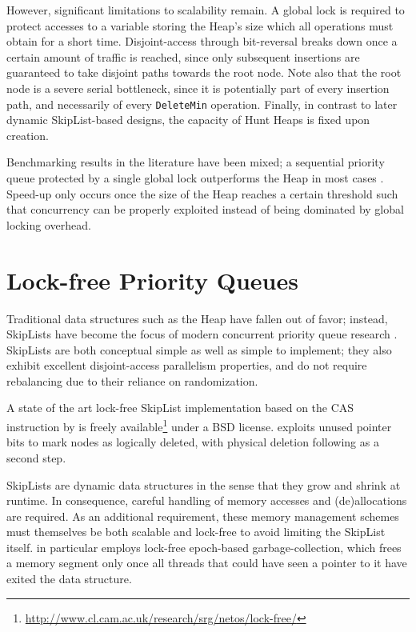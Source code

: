 \documentclass[a4paper,10pt]{article}
\begin{document}
However, significant limitations to scalability remain. A global lock is required
to protect accesses to a variable storing the Heap's size which all operations
must obtain for a short time. Disjoint-access through bit-reversal breaks down
once a certain amount of traffic is reached, since only subsequent insertions
are guaranteed to take disjoint paths towards the root node. Note also that
the root node is a severe serial bottleneck, since it is potentially part of
every insertion path, and necessarily of every \lstinline|DeleteMin| operation.
Finally, in contrast to later dynamic SkipList-based designs, the capacity of Hunt Heaps
is fixed upon creation.

Benchmarking results in the literature have been mixed; a sequential priority
queue protected by a single global lock outperforms the \citeauthor{hunt1996efficient}
Heap in most cases \cite{hunt1996efficient,sundell2003fast}. Speed-up only occurs once
the size of the Heap reaches a certain threshold such that concurrency
can be properly exploited instead of being dominated by global locking overhead.

\section{Lock-free Priority Queues} \label{sec:lockfree}

Traditional data structures such as the Heap have fallen out of favor;
instead, SkipLists \cite{pugh1990skip,pugh1998concurrent} have become the focus
of modern concurrent priority queue research
\cite{shavit2000skiplist,sundell2003fast,herlihy2012art,linden2013skiplist,alistarhspraylist}.
SkipLists are both conceptual simple as well as simple to implement; they also exhibit
excellent disjoint-access parallelism properties, and do not require rebalancing due to their
reliance on randomization.

A state of the art lock-free SkipList implementation based on the \ac{CAS} instruction
by \citeauthor{fraser2004practical} \cite{fraser2004practical} is freely available\footnote{
\url{http://www.cl.cam.ac.uk/research/srg/netos/lock-free/}} under a BSD license.
\citeauthor{fraser2004practical} exploits unused pointer bits to mark nodes as logically
deleted, with physical deletion following as a second step.

SkipLists are dynamic data structures in the sense that they grow and shrink
at runtime. In consequence, careful handling of memory accesses and (de)allocations
are required. As an additional requirement, these memory management schemes must
themselves be both scalable and lock-free to avoid limiting the SkipList itself.
\citeauthor{fraser2004practical} in particular employs lock-free epoch-based garbage-collection,
which frees a memory segment only once all threads that could have seen a pointer to it have
exited the data structure.
\end{document}
